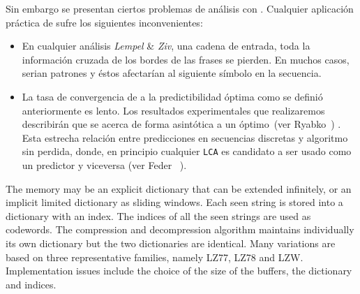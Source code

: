 




Sin embargo se presentan ciertos problemas de análisis con \lzSieteOcho. Cualquier aplicación práctica de \lzSieteOcho sufre  los siguientes inconvenientes: 

\begin{itemize}
	\menorEspacioItemize	
	\item En cualquier análisis \emph{Lempel} \& \emph{Ziv}, una cadena de entrada, toda la información cruzada de los bordes de las frases se pierden. En muchos casos, serian patrones y éstos afectarían al siguiente símbolo en la secuencia.
	
	\item La tasa de convergencia de \lzSieteOcho a la predictibilidad óptima como se definió anteriormente es lento. Los resultados experimentales que realizaremos  describirán que \lzSieteOcho se acerca de forma asintótica a un óptimo~(ver Ryabko~\etal \cite{Ryabko2002}) . Esta estrecha relación entre predicciones en secuencias discretas y algoritmo sin perdida, donde, en principio cualquier \texttt{LCA} es candidato a ser usado como un predictor y viceversa (ver Feder \etal~\cite{Feder1992}). 
	
\end{itemize}



The memory may be an explicit dictionary that can be extended infinitely, or an implicit limited dictionary as sliding windows. Each seen string is stored into a dictionary with an index. The indices of all the seen strings are used as codewords. The compression and decompression algorithm maintains individually its own dictionary but the two dictionaries are identical. Many variations are based on three representative families, namely LZ77, LZ78 and LZW. Implementation issues include the choice of the size of the buffers, the dictionary and indices.

